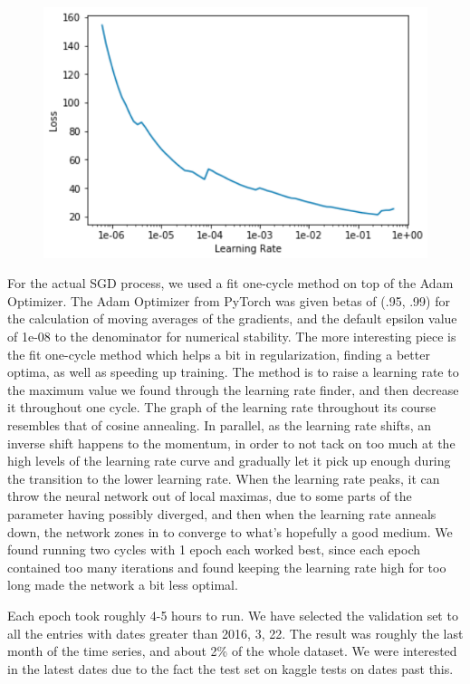 \documentclass[10pt,twocolumn,letterpaper]{article}
\begin{document}
  \begin{figure}[]
    \centering
    \includegraphics[width=0.7\linewidth]{img/learningRate.png}
    \label{learningRate}
  \end{figure}

  For the actual SGD process, we used a fit one-cycle method on top of the Adam
  Optimizer. The Adam Optimizer from PyTorch was given betas of (.95, .99) for
  the calculation of moving averages of the gradients, and the default epsilon
  value of 1e-08 to the denominator for numerical stability. The more
  interesting piece is the fit one-cycle method which helps a bit in
  regularization, finding a better optima, as well as speeding up training. The
  method is to raise a learning rate to the maximum value we found through the
  learning rate finder, and then decrease it throughout one cycle. The graph of
  the learning rate throughout its course resembles that of cosine annealing. In
  parallel, as the learning rate shifts, an inverse shift happens to the
  momentum, in order to not tack on too much at the high levels of the learning
  rate curve and gradually let it pick up enough during the transition to the
  lower learning rate. When the learning rate peaks, it can throw the neural
  network out of local maximas, due to some parts of the parameter having
  possibly diverged, and then when the learning rate anneals down, the network
  zones in to converge to what’s hopefully a good medium. We found running two
  cycles with 1 epoch each worked best, since each epoch contained too many
  iterations and found keeping the learning rate high for too long made the
  network a bit less optimal.

  Each epoch took roughly 4-5 hours to run. We have selected the validation set
  to all the entries with dates greater than 2016, 3, 22. The result was roughly
  the last month of the time series, and about 2\% of the whole dataset. We were
  interested in the latest dates due to the fact the test set on kaggle tests on
  dates past this.
\end{document}
